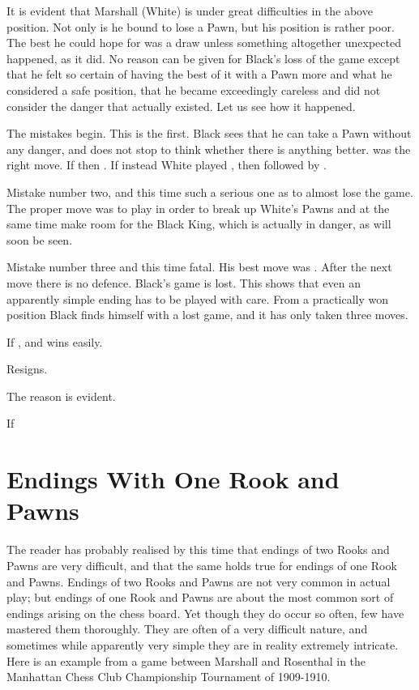 \documentclass[11pt,a4paper]{book}
\begin{document}
It is evident that Marshall (White) is under great difficulties in the above position. Not only is he bound to lose a Pawn, but his position is rather poor. The best he could hope for was a draw unless something altogether unexpected happened, as it did. No reason can be given for Black's loss of the game except that he felt so certain of having the best of it with a Pawn more and what he considered a safe position, that he became exceedingly careless and did not consider the danger that actually existed. Let us see how it happened.

 The mistakes begin. This is the first. Black sees that he can take a Pawn without any danger, and does not stop to think whether there is anything better.  was the right move. If then . If instead White played , then followed by .

 Mistake number two, and this time such a serious one as to almost lose the game. The proper move was to play  in order to break up White's Pawns and at the same time make room for the Black King, which is actually in danger, as will soon be seen.


 Mistake number three and this time fatal. His best move was . After the next move there is no defence. Black's game is lost. This shows that even an apparently simple ending has to be played with care. From a practically won position Black finds himself with a lost game, and it has only taken three moves.

 If , and wins easily.

 Resigns.

The reason is evident. 

If 

\section{Endings With One Rook and Pawns}

The reader has probably realised by this time that endings of two Rooks and Pawns are very difficult, and that the same holds true for endings of one Rook and Pawns. Endings of two Rooks and Pawns are not very common in actual play; but endings of one Rook and Pawns are about the most common sort of endings arising on the chess board. Yet though they do occur so often, few have mastered them thoroughly. They are often of a very difficult nature, and sometimes while apparently very simple they are in reality extremely intricate. Here is an example from a game between Marshall and Rosenthal in the Manhattan Chess Club Championship Tournament of 1909-1910.
\end{document}
